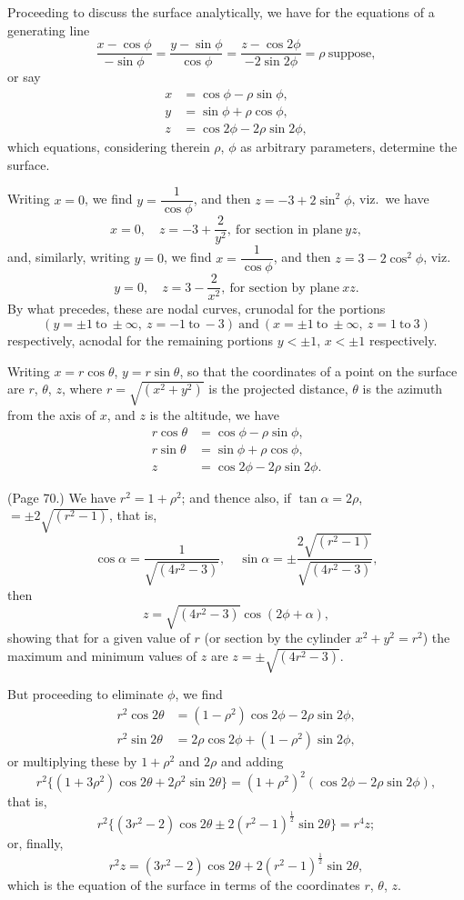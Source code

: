 \documentclass[11pt,a4paper]{article}
\begin{document}
Proceeding to discuss the surface analytically, we have for the equations of a generating line
\[
\frac{x - \cos\phi}{-\sin\phi} = \frac{y - \sin\phi}{\cos\phi} = \frac{z - \cos 2\phi}{-2\sin 2\phi} = \rho\ \text{suppose},
\]
or say
\begin{align*}
x &= \cos\phi - \rho\sin\phi, \\
y &= \sin\phi + \rho\cos\phi, \\
z &= \cos 2\phi - 2\rho\sin 2\phi,
\end{align*}
which equations, considering therein $\rho$, $\phi$ as arbitrary parameters, determine the surface.

Writing $x = 0$, we find $y = \dfrac{1}{\cos\phi}$, and then $z = -3 + 2\sin^2\phi$, viz.\ we have
\[
x = 0,\quad z = -3 + \frac{2}{y^2},\ \text{for section in plane}\ yz,
\]
and, similarly, writing $y = 0$, we find $x = \dfrac{1}{\cos\phi}$, and then $z = 3 - 2\cos^2\phi$, viz.\
\[
y = 0,\quad z = 3 - \frac{2}{x^2},\ \text{for section by plane}\ xz.
\]
By what precedes, these are nodal curves, crunodal for the portions
\[
(y = \pm 1\ \text{to}\ \pm\infty,\ z = -1\ \text{to}\ -3)\ \text{and}\ (x = \pm 1\ \text{to}\ \pm\infty,\ z = 1\ \text{to}\ 3)
\]
respectively, acnodal for the remaining portions $y < \pm 1$, $x < \pm 1$ respectively.

Writing $x = r\cos\theta$, $y = r\sin\theta$, so that the coordinates of a point on the surface are $r$, $\theta$, $z$, where $r = \sqrt{(x^2 + y^2)}$ is the projected distance, $\theta$ is the azimuth from the axis of $x$, and $z$ is the altitude, we have
\begin{align*}
r\cos\theta &= \cos\phi - \rho\sin\phi, \\
r\sin\theta &= \sin\phi + \rho\cos\phi, \\
z &= \cos 2\phi - 2\rho\sin 2\phi.
\end{align*}

\bigskip

\noindent (Page 70.) We have $r^2 = 1 + \rho^2$; and thence also, if $\tan\alpha = 2\rho$, $= \pm 2\sqrt{(r^2 - 1)}$, that is,
\[
\cos\alpha = \frac{1}{\sqrt{(4r^2 - 3)}},\quad \sin\alpha = \pm\frac{2\sqrt{(r^2 - 1)}}{\sqrt{(4r^2 - 3)}},
\]
then
\[
z = \sqrt{(4r^2 - 3)}\cos(2\phi + \alpha),
\]
showing that for a given value of $r$ (or section by the cylinder $x^2 + y^2 = r^2$) the maximum and minimum values of $z$ are $z = \pm\sqrt{(4r^2 - 3)}$.

But proceeding to eliminate $\phi$, we find
\begin{align*}
r^2 \cos 2\theta &= (1 - \rho^2)\cos 2\phi - 2\rho\sin 2\phi, \\
r^2 \sin 2\theta &= 2\rho\cos 2\phi + (1 - \rho^2)\sin 2\phi,
\end{align*}
or multiplying these by $1 + \rho^2$ and $2\rho$ and adding
\[
r^2 \{(1 + 3\rho^2)\cos 2\theta + 2\rho^2 \sin 2\theta\} = (1 + \rho^2)^2 (\cos 2\phi - 2\rho\sin 2\phi),
\]
that is,
\[
r^2 \{(3r^2 - 2)\cos 2\theta \pm 2(r^2 - 1)^{\tfrac{1}{2}} \sin 2\theta\} = r^4 z;
\]
or, finally,
\[
r^2 z = (3r^2 - 2)\cos 2\theta + 2(r^2 - 1)^{\tfrac{1}{2}} \sin 2\theta,
\]
which is the equation of the surface in terms of the coordinates $r$, $\theta$, $z$.
\end{document}
